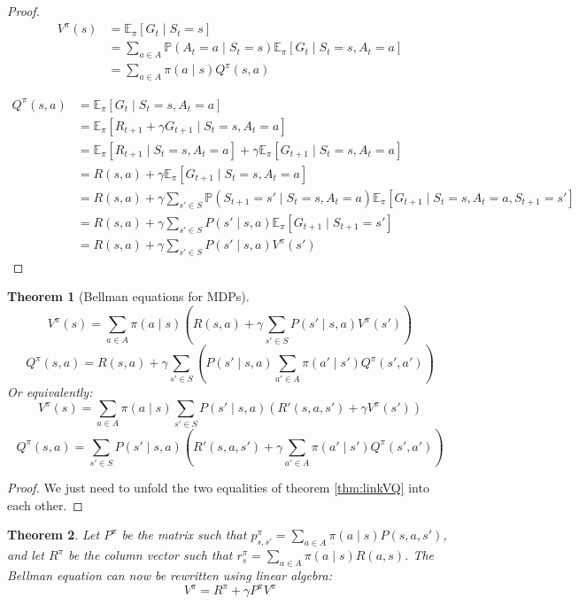 \documentclass{article}
\newtheorem{theorem}{Theorem}[section]
\theoremstyle{definition}
\theoremstyle{remark}
\theoremstyle{example}
\begin{document}
\begin{proof}
		\begin{align*}
				V^\pi(s) &= \mathbb{E}_\pi[G_t \mid S_t = s]\\
							&= \sum_{a \in A} \mathbb{P}(A_t = a \mid S_t = s) \mathbb{E}_\pi[G_t \mid S_t = s, A_t = a]\\
							&= \sum_{a \in A} \pi(a \mid s) Q^\pi(s, a)
		\end{align*}

		\begin{align*}
				Q^\pi(s, a) &= \mathbb{E}_\pi[G_t \mid S_t = s, A_t = a]\\
								&= \mathbb{E}_\pi[R_{t+1} + \gamma G_{t+1} \mid S_t = s, A_t = a]\\
								&= \mathbb{E}_\pi[R_{t+1} \mid S_t = s, A_t = a] + \gamma \mathbb{E}_\pi[G_{t+1} \mid S_t = s, A_t = a]\\
								&= R(s, a) + \gamma \mathbb{E}_\pi[G_{t+1} \mid S_t = s, A_t = a]\\
								&= R(s, a) + \gamma \sum_{s' \in S} \mathbb{P}(S_{t+1} = s' \mid S_t = s, A_t = a) \mathbb{E}_\pi[G_{t+1} \mid S_t = s, A_t = a, S_{t+1} = s']\\
								&= R(s, a) + \gamma \sum_{s' \in S} P(s' \mid s, a) \mathbb{E}_\pi[G_{t+1} \mid S_{t+1} = s']\\
								&= R(s, a) + \gamma \sum_{s' \in S} P(s' \mid s, a) V^\pi(s')
		\end{align*}
\end{proof}

\begin{theorem}[Bellman equations for MDPs]
				$$V^\pi(s) = \sum_{a \in A} \pi(a \mid s)(R(s, a) + \gamma \sum_{s' \in S} P(s' \mid s, a) V^\pi(s'))$$
				$$Q^\pi(s, a) = R(s, a) + \gamma \sum_{s' \in S}(P(s' \mid s, a) \sum_{a' \in A} \pi(a' \mid s') Q^\pi(s', a'))$$
		Or equivalently:
				$$V^\pi(s) = \sum_{a \in A} \pi(a \mid s) \sum_{s' \in S} P(s' \mid s, a)(R'(s, a, s') + \gamma V^\pi(s'))$$
				$$Q^\pi(s, a) = \sum_{s' \in S} P(s' \mid s, a)(R'(s, a, s') + \gamma \sum_{a' \in A} \pi(a' \mid s') Q^\pi(s', a'))$$
\end{theorem}

\begin{proof}
		We just need to unfold the two equalities of theorem \ref{thm:linkVQ} into each other.
\end{proof}

\begin{theorem}
		Let $P^\pi$ be the matrix such that $p^\pi_{s, s'} = \sum_{a \in A} \pi(a \mid s) P(s, a, s')$, and let $R^\pi$ be the column vector such that $r^\pi_s = \sum_{a \in A} \pi(a \mid s) R(a, s)$. The Bellman equation can now be rewritten using linear algebra:
				$$V^\pi = R^\pi + \gamma P^\pi V^\pi$$
\end{theorem}
\end{document}
